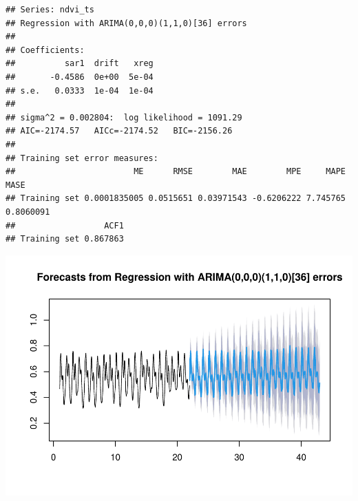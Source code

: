 \documentclass[
]{article}
\newenvironment{Shaded}{}{}
\newcommand{\AttributeTok}[1]{\textcolor[rgb]{0.49,0.56,0.16}{#1}}
\newcommand{\CommentTok}[1]{\textcolor[rgb]{0.38,0.63,0.69}{\textit{#1}}}
\newcommand{\ConstantTok}[1]{\textcolor[rgb]{0.53,0.00,0.00}{#1}}
\newcommand{\FunctionTok}[1]{\textcolor[rgb]{0.02,0.16,0.49}{#1}}
\newcommand{\NormalTok}[1]{#1}
\newcommand{\OtherTok}[1]{\textcolor[rgb]{0.00,0.44,0.13}{#1}}
\newcommand{\SpecialCharTok}[1]{\textcolor[rgb]{0.25,0.44,0.63}{#1}}
\newcommand{\StringTok}[1]{\textcolor[rgb]{0.25,0.44,0.63}{#1}}
\begin{document}
\begin{verbatim}
## Series: ndvi_ts 
## Regression with ARIMA(0,0,0)(1,1,0)[36] errors 
## 
## Coefficients:
##          sar1  drift   xreg
##       -0.4586  0e+00  5e-04
## s.e.   0.0333  1e-04  1e-04
## 
## sigma^2 = 0.002804:  log likelihood = 1091.29
## AIC=-2174.57   AICc=-2174.52   BIC=-2156.26
## 
## Training set error measures:
##                        ME      RMSE        MAE        MPE     MAPE      MASE
## Training set 0.0001835005 0.0515651 0.03971543 -0.6206222 7.745765 0.8060091
##                  ACF1
## Training set 0.867863
\end{verbatim}

\begin{Shaded}
\end{Shaded}

\begin{center}\includegraphics{BI_VegetationResponse_Project_HarvardX_Ph125_9x_files/figure-latex/ml_rain_ndvi_arimax-1} \end{center}
\end{document}
